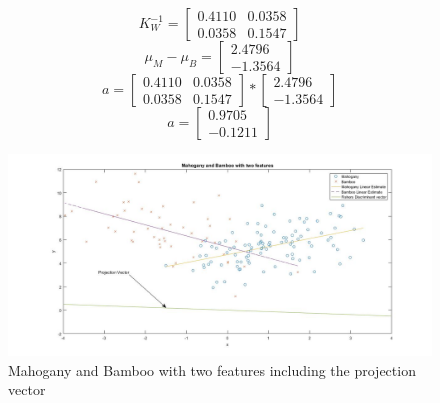 \documentclass[a4paper,11pt]{article}
\begin{document}
 \[
K_W^{-1} =
  \begin{bmatrix}
   0.4110 & 0.0358  \\
     0.0358 &0.1547
  \end{bmatrix}
\]
 \[
 \mu_M-\mu_B =
  \begin{bmatrix}
   2.4796 \\
   -1.3564
  \end{bmatrix}
\]
 \[
 a =
   \begin{bmatrix}
   0.4110 & 0.0358  \\
     0.0358 &0.1547
  \end{bmatrix}
  *
  \begin{bmatrix}
   2.4796 \\
   -1.3564
  \end{bmatrix}
\]
 \[
a =
  \begin{bmatrix}
     0.9705  \\
    -0.1211
  \end{bmatrix}
\]
\begin{figure}[h]
  \hspace*{-6cm}
   \includegraphics[scale=0.5]{q1_d}
   \caption{Mahogany and Bamboo with two features including the projection vector}\label{fig:q1_d}
\end{figure}
\clearpage
\newpage
\end{document}
